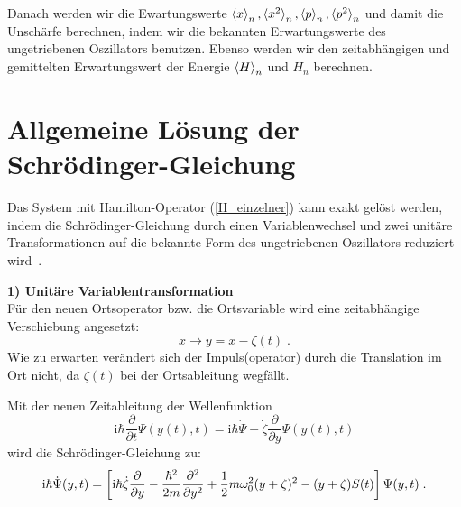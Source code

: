       Danach werden wir die Ewartungswerte $\braket{x}_n,\braket{x^2}_n,\braket{p}_n,\braket{p^2}_n$ und damit die Unschärfe berechnen, indem wir die bekannten Erwartungswerte des ungetriebenen Oszillators benutzen.
      Ebenso werden wir den zeitabhängigen und gemittelten Erwartungswert der Energie $\braket{H}_n$ und $\overline{H}_n$ berechnen.
\fi


    \section{Allgemeine Lösung der Schrödinger-Gleichung}
      \label{lsg_einzelner}
      Das System mit Hamilton-Operator (\ref{H_einzelner}) kann exakt gelöst werden, indem die Schrödinger-Gleichung durch einen Variablenwechsel und zwei unitäre Transformationen auf die bekannte Form des ungetriebenen Oszillators reduziert wird~\cite{haengi}.

      \textbf{1) Unitäre Variablentransformation}\\
      Für den neuen Ortsoperator bzw. die Ortsvariable wird eine zeitabhängige Verschiebung angesetzt:
      \begin{equation}
        x \rightarrow y=x-\zeta(t) \; .
      \end{equation}
      Wie zu erwarten verändert sich der Impuls(operator) durch die Translation im Ort nicht, da $\zeta(t)$ bei der Ortsableitung wegfällt.

      Mit der neuen Zeitableitung der Wellenfunktion
      \begin{equation}
        \text{i}\hbar \frac{\partial}{\partial t} \Psi(y(t),t) = \text{i}\hbar \dot{\Psi} -\dot{\zeta}\frac{\partial}{\partial y}\Psi(y(t),t)
      \end{equation}
      wird die Schrödinger-Gleichung zu:
      \begin{equation}
        \text i \hbar \dot{\Psi}(y,t) = \left[\text i \hbar \dot{\zeta}\frac{\partial}{\partial y}-\frac{\hbar^2}{2m}\frac{\partial^2}{\partial y^2}+\frac{1}{2}m\omega_0^2(y+\zeta)^2-(y+\zeta)S(t)\right]\Psi(y,t) \; .
        \label{schroedinger_einzeln_getrieben}
      \end{equation}

